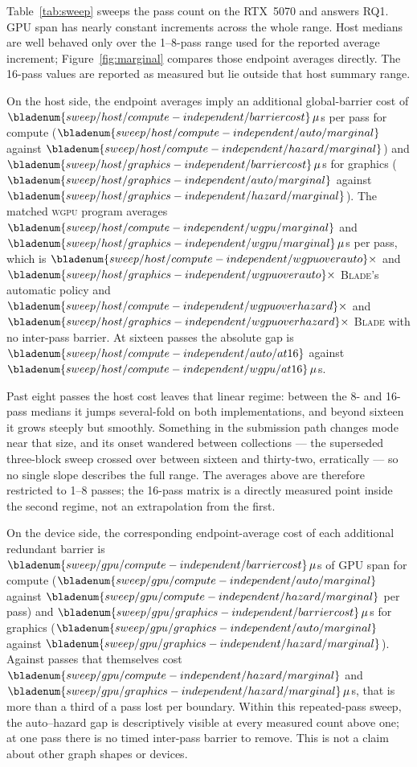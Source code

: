 \documentclass[10pt,twocolumn]{article}
\newcommand{\blade}{\textsc{Blade}}
\newcommand{\wgpu}{\textsc{wgpu}}
\begin{document}
Table~\ref{tab:sweep} sweeps the pass count on the RTX~5070 and answers RQ1.
GPU span has nearly constant increments across the whole range. Host medians
are well behaved only over the 1--8-pass range used for the reported average
increment; Figure~\ref{fig:marginal} compares those endpoint averages directly.
The 16-pass values are reported as measured but lie outside that host summary
range.

On the host side, the endpoint averages imply an additional global-barrier
cost of
$\bladenum{sweep/host/compute-independent/barriercost}\,\mu$s per pass for
compute ($\bladenum{sweep/host/compute-independent/auto/marginal}$ against
$\bladenum{sweep/host/compute-independent/hazard/marginal}$) and
$\bladenum{sweep/host/graphics-independent/barriercost}\,\mu$s for graphics
($\bladenum{sweep/host/graphics-independent/auto/marginal}$ against
$\bladenum{sweep/host/graphics-independent/hazard/marginal}$). The matched
\wgpu{} program averages
$\bladenum{sweep/host/compute-independent/wgpu/marginal}$ and
$\bladenum{sweep/host/graphics-independent/wgpu/marginal}\,\mu$s per pass,
which is $\bladenum{sweep/host/compute-independent/wgpuoverauto}\times$ and
$\bladenum{sweep/host/graphics-independent/wgpuoverauto}\times$ \blade's
automatic policy and
$\bladenum{sweep/host/compute-independent/wgpuoverhazard}\times$ and
$\bladenum{sweep/host/graphics-independent/wgpuoverhazard}\times$ \blade{} with
no inter-pass barrier. At sixteen passes the absolute gap is
$\bladenum{sweep/host/compute-independent/auto/at16}$ against
$\bladenum{sweep/host/compute-independent/wgpu/at16}\,\mu$s.

Past eight passes the host cost leaves that linear regime: between the 8- and
16-pass medians it jumps several-fold on both implementations, and beyond
sixteen it grows steeply but smoothly. Something in the submission path
changes mode near that size, and its onset wandered between collections ---
the superseded three-block sweep crossed over between sixteen and thirty-two,
erratically --- so no single slope describes the full range. The averages
above are therefore restricted to 1--8 passes; the 16-pass matrix is a
directly measured point inside the second regime, not an extrapolation from
the first.

On the device side, the corresponding endpoint-average cost of each additional
redundant barrier is
$\bladenum{sweep/gpu/compute-independent/barriercost}\,\mu$s of GPU span for
compute ($\bladenum{sweep/gpu/compute-independent/auto/marginal}$ against
$\bladenum{sweep/gpu/compute-independent/hazard/marginal}$ per pass) and
$\bladenum{sweep/gpu/graphics-independent/barriercost}\,\mu$s for graphics
($\bladenum{sweep/gpu/graphics-independent/auto/marginal}$ against
$\bladenum{sweep/gpu/graphics-independent/hazard/marginal}$). Against passes
that themselves cost $\bladenum{sweep/gpu/compute-independent/hazard/marginal}$
and $\bladenum{sweep/gpu/graphics-independent/hazard/marginal}\,\mu$s, that is
more than a third of a pass lost per boundary. Within this repeated-pass sweep,
the auto--hazard gap is descriptively visible at every measured count above
one; at one pass there is no timed inter-pass barrier to remove. This is not a
claim about other graph shapes or devices.
\end{document}
